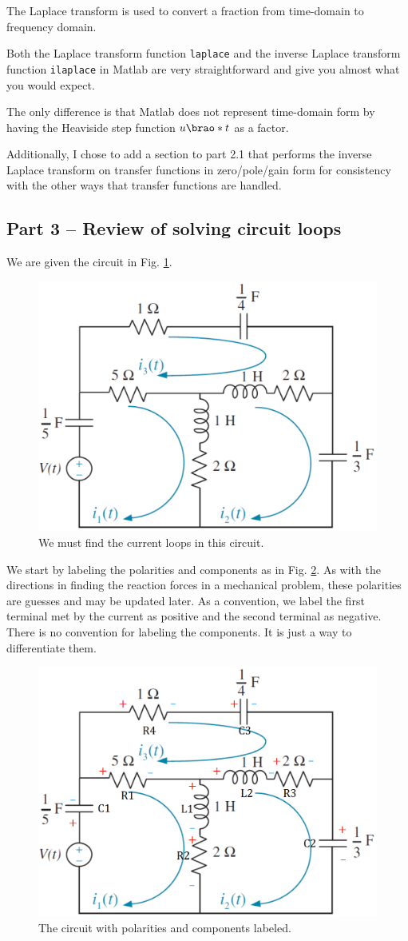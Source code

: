 \documentclass[12pt]{article}
\DeclarePairedDelimiter\brao()%
\begin{document}
The Laplace transform is used to convert a fraction from time-domain to frequency domain.

Both the Laplace transform function \texttt{laplace}
and the inverse Laplace transform function \texttt{ilaplace} in Matlab are
very straightforward and give you almost what you would expect.

The only difference is that Matlab does not represent time-domain form by having the Heaviside step function $u\brao*t$ as a factor.

Additionally, I chose to add a section to part 2.1 that performs the inverse Laplace transform on transfer functions in zero/pole/gain form for consistency with the other ways that transfer functions are handled.

\subsection{Part 3 -- Review of solving circuit loops}

We are given the circuit in Fig. \ref{fig:circuit}.

\begin{figure}[h!]
    \centering
    \includegraphics[width=0.5\linewidth]{part03_circuit.png}
    \caption{We must find the current loops in this circuit.}
    \label{fig:circuit}
\end{figure}

We start by labeling the polarities and components as in Fig. \ref{fig:circuit labeled}.
As with the directions in finding the reaction forces in a mechanical problem, these polarities are guesses and may be updated later.
As a convention, we label the first terminal met by the current as positive and the second terminal as negative.
There is no convention for labeling the components. It is just a way to differentiate them.

\begin{figure}[h!]
    \centering
    \includegraphics[width=0.5\linewidth]{part03_circuit-labeled.png}
    \caption{The circuit with polarities and components labeled.}
    \label{fig:circuit labeled}
\end{figure}
\end{document}
